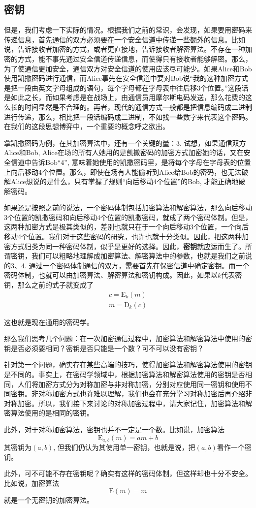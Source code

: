 \documentclass[UTF8]{ctexrep}
\def\pth#1{\left( {#1}\right)}
\def\E#1#2{{\mathrm{E}_{#1}\left({#2}\right)}}
\def\D#1#2{{\mathrm{D}_{#1}\left({#2}\right)}}
\begin{document}
\subsection{密钥}
但是，我们考虑一下实际的情况。根据我们之前的常识，会发现，如果要用密码来传递信息，首先通信的双方必须要在一个安全信道中传递一些额外的信息。比如说，告诉接收者加密的方式，或者更直接地，告诉接收者解密算法。不存在一种加密的方式，能不事先通过安全信道传递信息，而使得只有接收者能够解密。那么，为了使通信更加安全，通信双方对安全信道的使用应该尽可能少。如果Alice和Bob使用凯撒密码进行通信，而Alice事先在安全信道中要对Bob说“我的这种加密方式是把一段由英文字母组成的语句，每个字母都在字母表中往后移3个位置。”这段话是如此之长，而如果考虑是在战场上，由通信员用摩尔斯电码发送，那么花费的这么长的时间显然是不合理的。再者，现代的通信方式一般都是把信息编码成二进制进行传递，那么，相比把一段话编码成二进制，不如找一些数字来代表这个密码。在我们的这段思想博弈中，一个重要的概念呼之欲出。\par
拿凯撒密码为例，在其加密算法中，还有一个关键的量：3. 试想，如果通信双方Alice和Bob, Alice在场的所有人她用的是凯撒密码的加密方式加密她的话，又在安全信道中告诉Bob``4'', 意味着她使用的凯撒密码里，是将每个字母在字母表的位置上向后移动4个位置。那么，即使在场有人能偷听到Alice给Bob的密码，也无法破解Alice想说的是什么，只有掌握了规则“向后移动4个位置”的Bob, 才能正确地破解密码。\par
如果还是按照之前的说法，一个密码体制包括加密算法和解密算法，那么向后移动3个位置的凯撒密码和向后移动4个位置的凯撒密码，就成了两个密码体制。但是，这两种加密方式是极其类似的，差别也就只在于一个向后移动3个位置，一个向后移动4个位置。我们对于这些密码的研究，也许也就十分类似。因此，把这两种加密方式归类为同一种密码体制，似乎是更好的选择。因此，\textbf{密钥}就应运而生了。所谓密钥，我们可以粗略地理解成加密算法、解密算法中的参数，也就是我们之前说的3、4. 通过一个密码体制通信的双方，需要首先在保密信道中确定密钥。而一个密码体制，也就可以由加密算法、解密算法和密钥构成。因此，如果以$k$代表密钥，那么之前的式子就变成了
\begin{gather*}
    c=\E{k}{m}\\
    m=\D{k}{c}
\end{gather*}

这也就是现在通用的密码学。\par
那么我们思考几个问题：在一次加密通信过程中，加密算法和解密算法中使用的密钥是否必须要相同？密钥是否只能是一个数？可不可以没有密钥？\par
针对第一个问题，确实存在某些高端的技巧，使得加密算法和解密算法使用的密钥是不同的。事实上，在密码学领域中，根据加密算法和解密算法使用的密钥是否相同，人们将加密方式分为对称加密与非对称加密，分别对应使用同一密钥和使用不同密钥。非对称加密方式也许难以理解，我们也会在充分学习对称加密后再介绍非对称加密。所以，我们接下来讨论的对称加密过程中，请大家记住，加密算法和解密算法使用的是相同的密钥。\par
此外，对于对称加密算法，密钥也并不一定是一个数。比如说，加密算法
\[\E{a, b}{m}=am+b\]
其密钥为$\pth{a, b}$, 但我们仍认为其使用单一密钥，也就是说，把$\pth{a, b}$看作一个密钥。\par
此外，可不可能不存在密钥呢？确实有这样的密码体制，但这样却也十分不安全。比如说，加密算法
\[\mathrm{E}\pth{m}=m\]
就是一个无密钥的加密算法。
\end{document}
